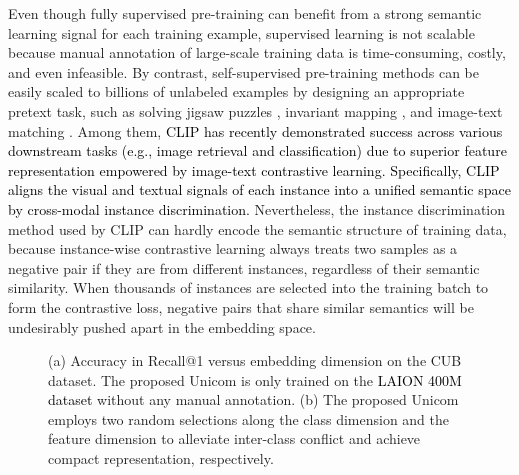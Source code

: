 \documentclass{article} \usepackage{iclr2023_conference,times}
\def\laion{LAION 400M dataset}
\begin{document}
Even though fully supervised pre-training can benefit from a strong semantic learning signal for each training example, supervised learning is not scalable because manual annotation of large-scale training data is time-consuming, costly, and even infeasible. 
By contrast, self-supervised pre-training methods \citep{he2020momentum,he2022masked,radford2021learning,jia2021scaling} can be easily scaled to billions of unlabeled examples by designing an appropriate pretext task, such as solving jigsaw puzzles \citep{noroozi2016unsupervised}, invariant mapping \citep{chen2021exploring}, and image-text matching \citep{radford2021learning,jia2021scaling}. Among them, \textcolor{black}{CLIP \citep{radford2021learning} has recently demonstrated success across various downstream tasks (e.g., image retrieval and classification) due to superior feature representation empowered by image-text contrastive learning. Specifically, CLIP aligns the visual and textual signals of each instance into a unified semantic space by cross-modal instance discrimination.}
Nevertheless, the instance discrimination method used by CLIP can hardly encode the semantic structure of training data, because instance-wise contrastive learning always treats two samples as a negative pair if they are from different instances, regardless of their semantic similarity. 
When thousands of instances are selected into the training batch to form the contrastive loss, negative pairs that share similar semantics will be undesirably pushed apart in the embedding space. 


\begin{figure}
\centering
{}
\caption{(a) Accuracy in Recall@1 versus embedding dimension on
the CUB dataset. The proposed Unicom is only trained on the \textcolor{black}{\laion{}} without any manual annotation. (b) The proposed Unicom employs two random selections along the class dimension and the feature dimension to alleviate inter-class conflict and achieve compact representation, respectively.}
\vspace{-4mm}
\label{fig:performanceandmethod}
\end{figure}
\end{document}
